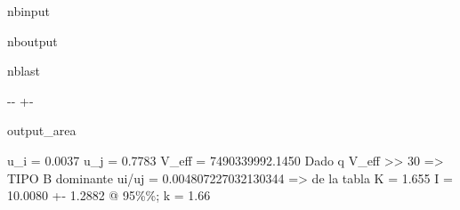 \documentclass[letterpaper,10pt,english]{sphinxmanual}
\let\sphinxpxdimen\pdfpxdimen\else\newdimen\sphinxpxdimen
\begin{document}
\begin{sphinxuseclass}{nbinput}
{\begin{sphinxVerbatim}[commandchars=\\\{\}]
  
 
     

\end{sphinxVerbatim}
}

\end{sphinxuseclass}
\begin{sphinxuseclass}{nboutput}
\begin{sphinxuseclass}{nblast}
{

\kern-\sphinxverbatimsmallskipamount\kern-\baselineskip
\kern+\FrameHeightAdjust\kern-\fboxrule
\vspace{\nbsphinxcodecellspacing}

\begin{sphinxuseclass}{output_area}
\begin{sphinxuseclass}{}


\begin{sphinxVerbatim}[commandchars=\\\{\}]
u\_i = 0.0037 u\_j = 0.7783
V\_eff = 7490339992.1450
Dado q V\_eff >> 30 => TIPO B dominante
ui/uj = 0.004807227032130344 => de la tabla K = 1.655
I = 10.0080 +- 1.2882 @ 95\%\%; k = 1.66
\end{sphinxVerbatim}



\end{sphinxuseclass}
\end{sphinxuseclass}
}

\end{sphinxuseclass}
\end{sphinxuseclass}
\sphinxAtStartPar
\sphinxincludegraphics[width=595\sphinxpxdimen,height=217\sphinxpxdimen]{{image10}.png}
\end{document}
